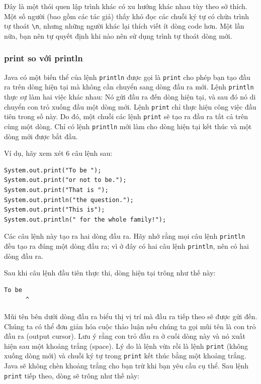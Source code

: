 Đây là một thói quen lập trình khác có xu hướng khác nhau tùy theo sở
thích. Một số người (bao gồm các tác giả) thấy khó đọc các chuỗi ký tự
có chứa trình tự thoát \texttt{\textbackslash{}n}, nhưng những người
khác lại thích viết ít dòng code hơn. Một lần nữa, bạn nên tự quyết định
khi nào nên sử dụng trình tự thoát dòng mới.

\subsubsection{print so với println}\label{print-so-vux1edbi-println}

Java có một biến thể của lệnh \texttt{println} được gọi là
\texttt{print} cho phép bạn tạo đầu ra trên dòng hiện tại mà không cần
chuyển sang dòng đầu ra mới. Lệnh \texttt{println} thực sự làm hai việc
khác nhau: Nó gửi đầu ra đến dòng hiện tại, và sau đó nó di chuyển con
trỏ xuống đầu một dòng mới. Lệnh \texttt{print} chỉ thực hiện công việc
đầu tiên trong số này. Do đó, một chuỗi các lệnh \texttt{print} sẽ tạo
ra đầu ra tất cả trên cùng một dòng. Chỉ có lệnh \texttt{println} mới
làm cho dòng hiện tại kết thúc và một dòng mới được bắt đầu.

Ví dụ, hãy xem xét 6 câu lệnh sau:

\begin{verbatim}
System.out.print("To be ");
System.out.print("or not to be.");
System.out.print("That is ");
System.out.println("the question.");
System.out.print("This is");
System.out.println(" for the whole family!");
\end{verbatim}

Các câu lệnh này tạo ra hai dòng đầu ra. Hãy nhớ rằng mọi câu lệnh
\texttt{println} đều tạo ra đúng một dòng đầu ra; vì ở đây có hai câu
lệnh \texttt{println}, nên có hai dòng đầu ra.

Sau khi câu lệnh đầu tiên thực thi, dòng hiện tại trông như thế này:

\begin{verbatim}
To be 
      ^
\end{verbatim}

Mũi tên bên dưới dòng đầu ra biểu thị vị trí mà đầu ra tiếp theo sẽ được
gửi đến. Chúng ta có thể đơn giản hóa cuộc thảo luận nếu chúng ta gọi
mũi tên là con trỏ đầu ra (output cursor). Lưu ý rằng con trỏ đầu ra ở
cuối dòng này và nó xuất hiện sau một khoảng trắng (space). Lý do là
lệnh vừa rồi là lệnh \texttt{print} (không xuống dòng mới) và chuỗi ký
tự trong \texttt{print} kết thúc bằng một khoảng trắng. Java sẽ không
chèn khoảng trắng cho bạn trừ khi bạn yêu cầu cụ thể. Sau lệnh
\texttt{print} tiếp theo, dòng sẽ trông như thế này:

